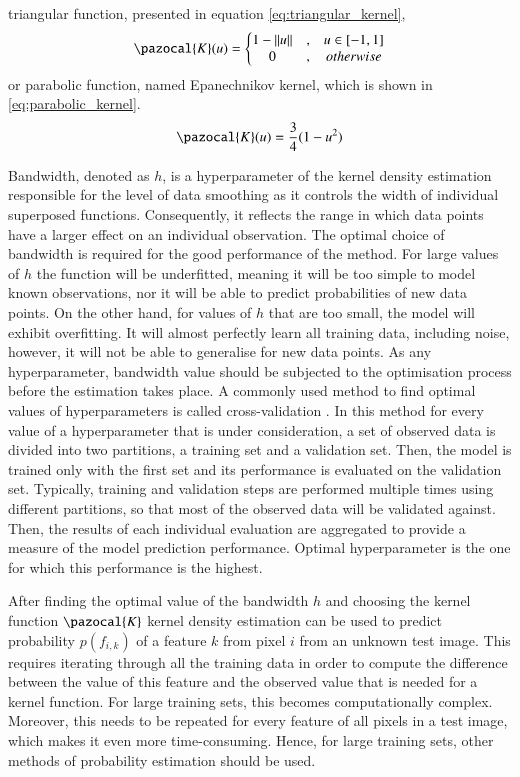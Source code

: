 triangular function, presented in equation \ref{eq:triangular_kernel},
\begin{equation}
    \label{eq:triangular_kernel}
    \pazocal{K}(u) = \left\{\begin{matrix}
         1 - \left \| u \right \| & , & u \in \left [ -1,1 \right ] \\
        0 &  , & otherwise
        \end{matrix}\right.
\end{equation}
or parabolic function, named Epanechnikov kernel, which is shown in  \ref{eq:parabolic_kernel}.
\begin{equation}
    \label{eq:parabolic_kernel}
    \pazocal{K}(u) = \frac{3}{4}(1-u^2)
\end{equation}

Bandwidth, denoted as $h$, is a hyperparameter of the kernel density estimation responsible for the level of data smoothing as it controls the width of individual superposed functions. Consequently, it reflects the range in which data points have a larger effect on an individual observation. The optimal choice of bandwidth is required for the good performance of the method. For large values of $h$ the function will be underfitted, meaning it will be too simple to model known observations, nor it will be able to predict probabilities of new data points. On the other hand, for values of $h$ that are too small, the model will exhibit overfitting. It will almost perfectly learn all training data, including noise, however, it will not be able to generalise for new data points. As any hyperparameter, bandwidth value should be subjected to the optimisation process before the estimation takes place. A commonly used method to find optimal values of hyperparameters is called cross-validation \cite{cross_validation}. In this method for every value of a hyperparameter that is under consideration, a set of observed data is divided into two partitions, a training set and a validation set. Then, the model is trained only with the first set and its performance is evaluated on the validation set. Typically, training and validation steps are performed multiple times using different partitions, so that most of the observed data will be validated against. Then, the results of each individual evaluation are aggregated to provide a measure of the model prediction performance. Optimal hyperparameter is the one for which this performance is the highest.

After finding the optimal value of the bandwidth $h$ and choosing the kernel function $\pazocal{K}$ kernel density estimation can be used to predict probability $p(f_{i,k})$ of a feature $k$ from pixel $i$ from an unknown test image. This requires iterating through all the training data in order to compute the difference between the value of this feature and the observed value that is needed for a kernel function. For large training sets, this becomes computationally complex. Moreover, this needs to be repeated for every feature of all pixels in a test image, which makes it even more time-consuming. Hence, for large training sets, other methods of probability estimation should be used. 

